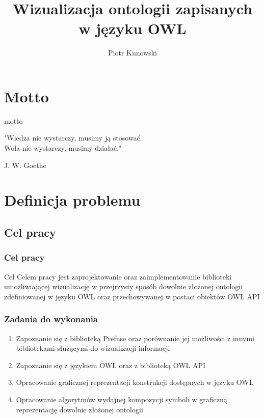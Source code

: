 \documentclass{beamer}
\title{Wizualizacja ontologii zapisanych w języku OWL}
\author{Piotr Kunowski}
\begin{document}
\begin{frame}
  \titlepage
\end{frame}

\section{Motto}
\begin{frame}
\begin{block}{motto} 

"Wiedza nie wystarczy, musimy ją stosować. \\
Wola nie wystarczy, musimy działać."
\begin{flushright}
J. W. Goethe
\end{flushright}
\end{block}
 

\end{frame}


\section{Definicja problemu}

\subsection{Cel pracy}

\begin{frame}
  \frametitle{Cel pracy}
  \begin{block}{Cel}
	Celem pracy jest zaprojektowanie oraz zaimplementowanie biblioteki umożliwiającej wizualizację w przejrzysty 
sposób dowolnie złożonej ontologii zdefiniowanej w języku OWL oraz przechowywanej w postaci obiektów OWL API
  \end{block}
\end{frame}

\begin{frame}
  \frametitle{Zadania do wykonania}
  \begin{enumerate}
    \item Zapoznanie się z biblioteką Prefuse oraz porównanie jej możliwości z innymi bibliotekami służącymi do wizualizacji informacji
    \item Zapoznanie się z językiem OWL oraz z biblioteką OWL API
    \item Opracowanie graficznej reprezentacji konstrukcji dostępnych w języku OWL
    \item Opracowanie algorytmów wydajnej kompozycji symboli w graficzną reprezentację dowolnie złożonej ontologii
  \end{enumerate}

\end{frame}
\end{document}
